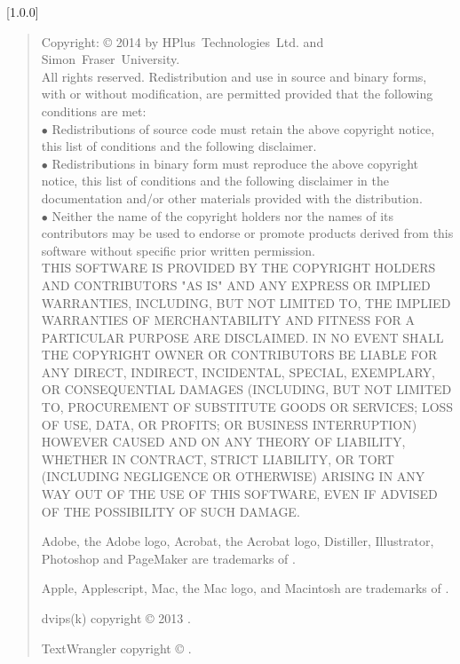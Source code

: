 [1.0.0]
\begin{quote}
\begin{small}
Copyright: \copyright{} 2014 by HPlus~Technologies~Ltd. and Simon~Fraser~University.
\\
All rights reserved. Redistribution and use in source and binary forms, with or without
modification, are permitted provided that the following conditions are met:\\
$\bullet$ Redistributions of source code must retain the above copyright notice, this list
of conditions and the following disclaimer.\\
$\bullet$ Redistributions in binary form must reproduce the above copyright notice, this
list of conditions and the following disclaimer in the documentation and/or other
materials provided with the distribution.\\
$\bullet$ Neither the name of the copyright holders nor the names of its contributors may
be used to endorse or promote products derived from this software without specific prior
written permission.\\
THIS SOFTWARE IS PROVIDED BY THE COPYRIGHT HOLDERS AND CONTRIBUTORS "AS IS" AND ANY
EXPRESS OR IMPLIED WARRANTIES, INCLUDING, BUT NOT LIMITED TO, THE IMPLIED WARRANTIES OF
MERCHANTABILITY AND FITNESS FOR A PARTICULAR PURPOSE ARE DISCLAIMED.
IN NO EVENT SHALL THE COPYRIGHT OWNER OR CONTRIBUTORS BE LIABLE FOR ANY DIRECT, INDIRECT,
INCIDENTAL, SPECIAL, EXEMPLARY, OR CONSEQUENTIAL DAMAGES (INCLUDING, BUT NOT LIMITED TO,
PROCUREMENT OF SUBSTITUTE GOODS OR SERVICES; LOSS OF USE, DATA, OR PROFITS; OR BUSINESS
INTERRUPTION) HOWEVER CAUSED AND ON ANY THEORY OF LIABILITY, WHETHER IN CONTRACT, STRICT
LIABILITY, OR TORT (INCLUDING NEGLIGENCE OR OTHERWISE) ARISING IN ANY WAY OUT OF THE USE
OF THIS SOFTWARE, EVEN IF ADVISED OF THE POSSIBILITY OF SUCH DAMAGE.

Adobe, the Adobe logo, Acrobat, the Acrobat logo, Distiller, Illustrator, Photoshop and
PageMaker are trademarks of
.

Apple, Applescript, Mac, the Mac logo, and Macintosh are trademarks of
.

dvips(k) copyright \copyright{} 2013
.

TextWrangler copyright \copyright{}
.


\end{small}
\end{quote}

